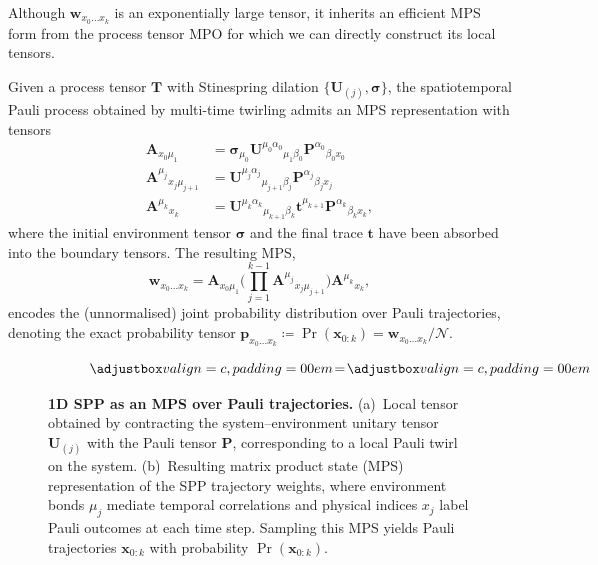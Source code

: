 Although \(\mathbf{w}_{x_0\dots x_k}\) is an exponentially large tensor, it inherits an efficient MPS form from the process tensor MPO for which we can directly construct its local tensors.
\begin{definition}\label{def:pt-mpo-to-spp-mps}
  Given a process tensor \(\mathbf T\) with Stinespring dilation \(\{\mathbf U_{(j)}, \pmb\sigma\}\), the spatiotemporal Pauli process obtained by multi-time twirling admits an MPS representation with tensors
  \begin{equation}\label{eq:spp-tensors}
  \begin{aligned}
    \mathbf{A}_{x_0\mu_{1}} 
    &= \pmb{\sigma}_{\mu_0}\mathbf{U}^{\mu_0\alpha_0}{}_{\mu_{1}\beta_0} \mathbf{P}^{\alpha_0}{}_{\beta_0 x_0} \\
    \mathbf{A}^{\mu_j}{}_{x_j\mu_{j+1}} 
    &= \mathbf{U}^{\mu_j\alpha_j}{}_{\mu_{j+1}\beta_j} \mathbf{P}^{\alpha_j}{}_{\beta_j x_j} \\
    \mathbf{A}^{\mu_k}{}_{x_k} 
    &= \mathbf{U}^{\mu_k\alpha_k}{}_{\mu_{k+1}\beta_k}\mathbf{t}^{\mu_{k+1}}
    \mathbf{P}^{\alpha_k}{}_{\beta_k x_k},
  \end{aligned}
  \end{equation}
  where the initial environment tensor \(\pmb{\sigma}\) and the final trace \(\mathbf{t}\) have been absorbed into the boundary tensors. The resulting MPS,
  \begin{equation}\label{eq:spp-mps}
    \mathbf{w}_{x_0\dots x_k} =
    \mathbf{A}_{x_0\mu_1}
    \Bigg(\prod_{j=1}^{k-1} 
    \mathbf{A}^{\mu_j}{}_{x_j\mu_{j+1} }\Bigg)
    \mathbf{A}^{\mu_k}{}_{x_k},
  \end{equation}
  encodes the (unnormalised) joint probability distribution over Pauli trajectories, denoting the exact probability tensor \(\mathbf{p}_{x_0\dots x_k} \coloneq \Pr(\mathbf{x}_{0:k}) = \mathbf{w}_{x_0\dots x_k}/\mathcal{N}\).
\end{definition}
\begin{figure}
    \centering
    \begin{subfigure}{0.49\textwidth}
      \centering
      \[
      \valignboxnopad{} 
      \!=\!
      \valignboxnopad{}
      \]
      \caption{}
    \end{subfigure}
    \begin{subfigure}{0.49\textwidth}
      \centering
      
      \vspace{8mm}
      \caption{}
    \end{subfigure}
    \caption{\textbf{1D SPP as an MPS over Pauli trajectories.} (a)~Local tensor obtained by contracting the system--environment unitary tensor \(\mathbf{U}_{(j)}\) with the Pauli tensor \(\mathbf{P}\), corresponding to a local Pauli twirl on the system. (b)~Resulting matrix product state (MPS) representation of the SPP trajectory weights, where environment bonds \(\mu_j\) mediate temporal correlations and physical indices \(x_j\) label Pauli outcomes at each time step. Sampling this MPS yields Pauli trajectories \(\mathbf{x}_{0:k}\) with probability \(\Pr(\mathbf{x}_{0:k})\).}
    \label{fig:spp-mps}
\end{figure}

